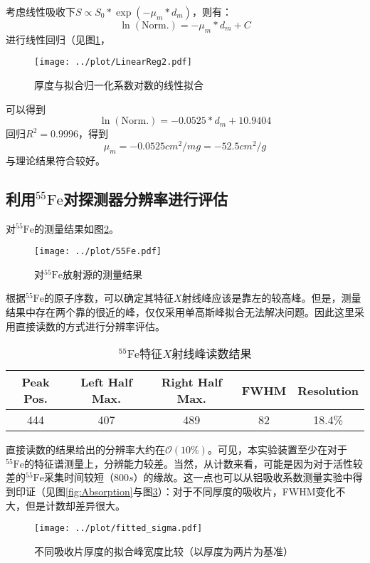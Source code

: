 \documentclass{article}
\begin{document}
    考虑线性吸收下$S\propto S_0*\exp(-\mu_m*d_m)$，则有：
    \begin{equation}
        \ln{(\text{Norm.})} = -\mu_m*d_m+C
    \end{equation}
    进行线性回归（见图\ref{fig:LinearReg2}，
    \begin{figure}[htbp]
        \centering
        \texttt{[image: ../plot/LinearReg2.pdf]}
        \caption{厚度与拟合归一化系数对数的线性拟合\label{fig:LinearReg2}}
    \end{figure}
    可以得到
    \begin{equation}
        \ln{(\text{Norm.})} = -0.0525*d_m+10.9404 
    \end{equation}
    回归$R^2 = 0.9996$，得到
    \begin{equation}
        \mu_m = -0.0525\si{cm^2\per mg} = -52.5\si{cm^2\per g}
    \end{equation}
    与理论结果符合较好。
    \subsection{利用$^{55}\text{Fe}$对探测器分辨率进行评估}
    对$^{55}\text{Fe}$的测量结果如图\ref{fig:55Fe}。
    \begin{figure}
        \centering
        \texttt{[image: ../plot/55Fe.pdf]}
        \caption{对$^{55}\text{Fe}$放射源的测量结果\label{fig:55Fe}}
    \end{figure}
    根据$^{55}\text{Fe}$的原子序数，可以确定其特征$X$射线峰应该是靠左的较高峰。但是，测量结果中存在两个靠的很近的峰，仅仅采用单高斯峰拟合无法解决问题。因此这里采用直接读数的方式进行分辨率评估。
    \begin{table}[htbp]
        \centering
        \caption{$^{55}\text{Fe}$特征$X$射线峰读数结果\label{tab:55Fe}}
        \begin{tabular}{ccccc}
            \toprule
            Peak Pos. &  Left Half Max. & Right Half Max.   &     FWHM        &       Resolution  \\
            \midrule
            444  &      407 &     489 &     82 &    18.4\% \\
            \bottomrule
            \end{tabular}
    \end{table} 
    直接读数的结果给出的分辨率大约在$\mathcal{O}(10\%)$。可见，本实验装置至少在对于$^{55}\text{Fe}$的特征谱测量上，分辨能力较差。当然，从计数来看，可能是因为对于活性较差的$^{55}\text{Fe}$采集时间较短（$800\si{s}$）的缘故。这一点也可以从铝吸收系数测量实验中得到印证（见图\ref{fig:Absorption}与图\ref{fig:fitted_sigma}）：对于不同厚度的吸收片，FWHM变化不大，但是计数却差异很大。
    \begin{figure}[htbp]
        \centering
        \texttt{[image: ../plot/fitted\_sigma.pdf]}
        \caption{不同吸收片厚度的拟合峰宽度比较（以厚度为两片为基准）\label{fig:fitted_sigma}}
    \end{figure}
\end{document}
